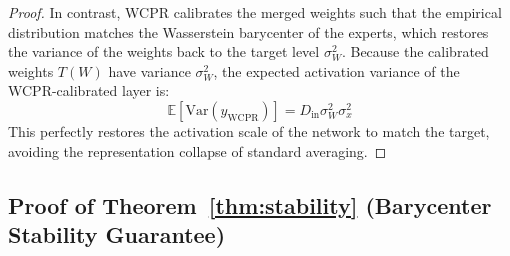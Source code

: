 \documentclass{article}
\theoremstyle{plain}
\theoremstyle{definition}
\theoremstyle{remark}
\begin{document}
\begin{proof}
  In contrast, WCPR calibrates the merged weights such that the empirical distribution matches the Wasserstein barycenter of the experts, which restores the variance of the weights back to the target level $\sigma^2_W$. Because the calibrated weights $T(W)$ have variance $\sigma^2_W$, the expected activation variance of the WCPR-calibrated layer is:
  \begin{equation}
    \mathbb{E}[\mathrm{Var}(y_{\mathrm{WCPR}})] = D_{\mathrm{in}} \sigma^2_W \sigma^2_x
  \end{equation}
  This perfectly restores the activation scale of the network to match the target, avoiding the representation collapse of standard averaging.
\end{proof}

\subsection{Proof of Theorem~\ref{thm:stability} (Barycenter Stability Guarantee)}
\label{app:proof_stability}
\end{document}
